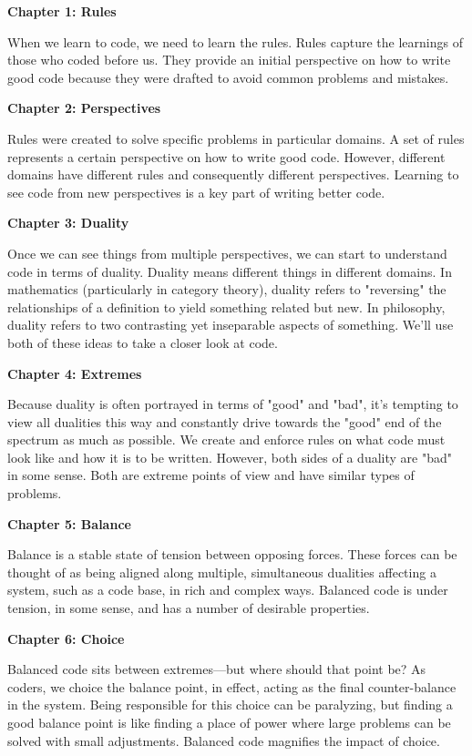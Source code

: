 \begin{adjustwidth}{0.25in}{0in}
\textbf{Chapter 1: Rules}

\noindent When we learn to code, we need to learn the rules. Rules capture the learnings
of those who coded before us. They provide an initial perspective on how to
write good code because they were drafted to avoid common problems and
mistakes.

\textbf{Chapter 2: Perspectives}

Rules were created to solve specific problems in particular domains. A set of
rules represents a certain perspective on how to write good code. However,
different domains have different rules and consequently different perspectives.
Learning to see code from new perspectives is a key part of writing better
code.

\textbf{Chapter 3: Duality}

Once we can see things from multiple perspectives, we can start to understand
code in terms of duality.  Duality means different things in different domains.
In mathematics (particularly in category theory), duality refers to "reversing"
the relationships of a definition to yield something related but new. In
philosophy, duality refers to two contrasting yet inseparable aspects of
something. We'll use both of these ideas to take a closer look at code.

\textbf{Chapter 4: Extremes}

Because duality is often portrayed in terms of "good" and "bad", it's tempting
to view all dualities this way and constantly drive towards the "good" end of
the spectrum as much as possible. We create and enforce rules on what code
must look like and how it is to be written. However, both sides of a duality
are "bad" in some sense. Both are extreme points of view and have similar types
of problems.

\textbf{Chapter 5: Balance}

Balance is a stable state of tension between opposing forces. These forces can
be thought of as being aligned along multiple, simultaneous dualities affecting
a system, such as a code base, in rich and complex ways. Balanced code is
under tension, in some sense, and has a number of desirable properties.

\textbf{Chapter 6: Choice}

Balanced code sits between extremes---but where should that point be? As
coders, we choice the balance point, in effect, acting as the final
counter-balance in the system. Being responsible for this choice can be
paralyzing, but finding a good balance point is like finding a place of power
where large problems can be solved with small adjustments. Balanced code
magnifies the impact of choice.


\end{adjustwidth}

